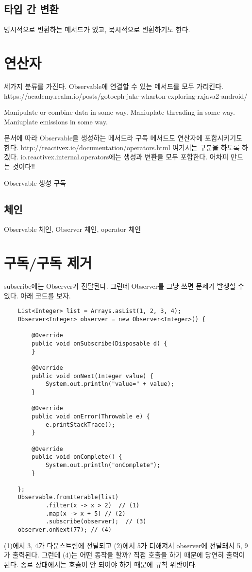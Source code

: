 \documentclass{book}
\begin{document}
\subsection{타입 간 변환}
명시적으로 변환하는 메서드가 있고, 묵시적으로 변환하기도 한다.

\section{연산자}
세가지 분류를 가진다. Observable에 연결할 수 있는 메서드를 모두 가리킨다.
https://academy.realm.io/posts/gotocph-jake-wharton-exploring-rxjava2-android/

Manipulate or combine data in some way.
Maniuplate threading in some way.
Maniuplate emissions in some way.

문서에 따라 Observable을 생성하는 메서드라 구독 메서드도 연산자에 포함시키기도 한다.
http://reactivex.io/documentation/operators.html
여기서는 구분을 하도록 하겠다.
io.reactivex.internal.operators에는 생성과 변환을 모두 포함한다.
어차피 만드는 것이다!!

Observable 생성
구독

\subsection{체인}
Observable 체인, Observer 체인, operator 체인


\section{구독/구독 제거}
subscribe에는 Observer가 전달된다. 그런데 Observer를 그냥 쓰면 문제가 발생할 수 있다.
아래 코드를 보자.
\begin{verbatim}
	List<Integer> list = Arrays.asList(1, 2, 3, 4);
	Observer<Integer> observer = new Observer<Integer>() {

		@Override
		public void onSubscribe(Disposable d) {
		}

		@Override
		public void onNext(Integer value) {
			System.out.println("value=" + value);
		}

		@Override
		public void onError(Throwable e) {
			e.printStackTrace();
		}

		@Override
		public void onComplete() {
			System.out.println("onComplete");
		}

	};
	Observable.fromIterable(list)
			.filter(x -> x > 2)  // (1)
			.map(x -> x + 5) // (2)
			.subscribe(observer);  // (3)
	observer.onNext(77); // (4)		
\end{verbatim}
(1)에서 3, 4가 다운스트림에 전달되고 (2)에서 5가 더해져서 observer에 전달돼서 5, 9가 출력된다.
그런데 (4)는 어떤 동작을 할까? 
직접 호출을 하기 때문에 당연히 출력이 된다.
종료 상태에서는 호출이 안 되어야 하기 때문에 규칙 위반이다.
\end{document}
